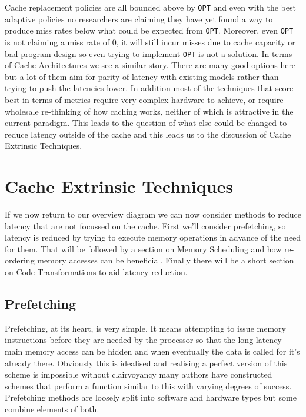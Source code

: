 Cache replacement policies are all bounded above by \texttt{OPT} and even with the best adaptive policies no researchers are claiming they have yet found a way to produce miss rates below what could be expected from \texttt{OPT}. Moreover, even \texttt{OPT} is not claiming a miss rate of 0, it will still incur misses due to cache capacity or bad program design so even trying to implement \texttt{OPT} is not a solution. In terms of Cache Architectures we see a similar story. There are many good options here but a lot of them aim for parity of latency with existing models rather than trying to push the latencies lower. In addition most of the techniques that score best in terms of metrics require very complex hardware to achieve, or require wholesale re-thinking of how caching works, neither of which is attractive in the current paradigm. This leads to the question of what else could be changed to reduce latency outside of the cache and this leads us to the discussion of Cache Extrinsic Techniques.

\section{Cache Extrinsic Techniques}

If we now return to our overview diagram we can now consider methods to reduce latency that are not focussed on the cache. First we'll consider prefetching, so latency is reduced by trying to execute memory operations in advance of the need for them. That will be followed by a section on Memory Scheduling and how re-ordering memory accesses can be beneficial. Finally there will be a short section on Code Transformations to aid latency reduction.

\subsection{Prefetching}

Prefetching, at its heart, is very simple. It means attempting to issue memory instructions before they are needed by the processor so that the long latency main memory access can be hidden and when eventually the data is called for it's already there. Obviously this is idealised and realising a perfect version of this scheme is impossible without clairvoyancy many authors have constructed schemes that perform a function similar to this with varying degrees of success. Prefetching methods are loosely split into software and hardware types but some combine elements of both.

